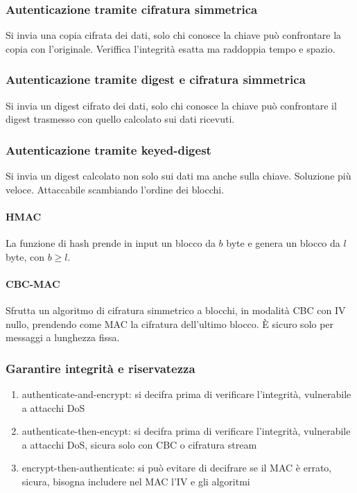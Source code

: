 \documentclass[11pt]{article}
\begin{document}
\subsubsection{Autenticazione tramite cifratura simmetrica}
Si invia una copia cifrata dei dati, solo chi conosce la chiave può confrontare la copia con l'originale. Veriffica 
l'integrità esatta ma raddoppia tempo e spazio.
\subsubsection{Autenticazione tramite digest e cifratura simmetrica}
Si invia un digest cifrato dei dati, solo chi conosce la chiave può confrontare il digest trasmesso con quello calcolato 
sui dati ricevuti.
\subsubsection{Autenticazione tramite keyed-digest}
Si invia un digest calcolato non solo sui dati ma anche sulla chiave. Soluzione più veloce. Attaccabile scambiando l'ordine 
dei blocchi.
\paragraph*{HMAC}
La funzione di hash prende in input un blocco da $b$ byte e genera un blocco da $l$ byte, con $b\geq l$.
\paragraph*{CBC-MAC}
Sfrutta un algoritmo di cifratura simmetrico a blocchi, in modalità CBC con IV nullo, prendendo come MAC la cifratura 
dell'ultimo blocco. È sicuro solo per messaggi a lunghezza fissa.
\subsubsection{Garantire integrità e riservatezza}
\begin{enumerate}
    \item authenticate-and-encrypt: si decifra prima di verificare l'integrità, vulnerabile a attacchi DoS 
    \item authenticate-then-encypt: si decifra prima di verificare l'integrità, vulnerabile a attacchi DoS, sicura solo 
    con CBC o cifratura stream
    \item encrypt-then-authenticate: si può evitare di decifrare se il MAC è errato, sicura, bisogna includere nel MAC 
    l'IV e gli algoritmi
\end{enumerate}
\end{document}
